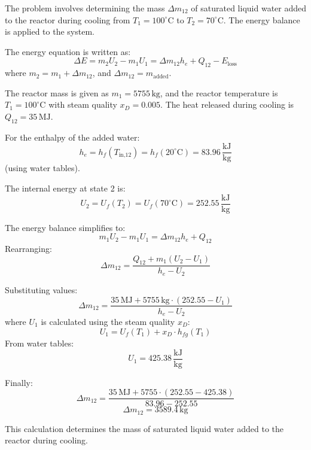 The problem involves determining the mass \( \Delta m_{12} \) of saturated liquid water added to the reactor during cooling from \( T_1 = 100^\circ\text{C} \) to \( T_2 = 70^\circ\text{C} \). The energy balance is applied to the system.

The energy equation is written as:  
\[
\Delta E = m_2 U_2 - m_1 U_1 = \Delta m_{12} h_e + Q_{12} - E_{\text{loss}}
\]  
where \( m_2 = m_1 + \Delta m_{12} \), and \( \Delta m_{12} = m_{\text{added}} \).  

The reactor mass is given as \( m_1 = 5755 \, \text{kg} \), and the reactor temperature is \( T_1 = 100^\circ\text{C} \) with steam quality \( x_D = 0.005 \). The heat released during cooling is \( Q_{12} = 35 \, \text{MJ} \).  

For the enthalpy of the added water:  
\[
h_e = h_f(T_{\text{in,12}}) = h_f(20^\circ\text{C}) = 83.96 \, \frac{\text{kJ}}{\text{kg}}
\]  
(using water tables).  

The internal energy at state 2 is:  
\[
U_2 = U_f(T_2) = U_f(70^\circ\text{C}) = 252.55 \, \frac{\text{kJ}}{\text{kg}}
\]  

The energy balance simplifies to:  
\[
m_1 U_2 - m_1 U_1 = \Delta m_{12} h_e + Q_{12}
\]  
Rearranging:  
\[
\Delta m_{12} = \frac{Q_{12} + m_1 (U_2 - U_1)}{h_e - U_2}
\]  

Substituting values:  
\[
\Delta m_{12} = \frac{35 \, \text{MJ} + 5755 \, \text{kg} \cdot (252.55 - U_1)}{h_e - U_2}
\]  
where \( U_1 \) is calculated using the steam quality \( x_D \):  
\[
U_1 = U_f(T_1) + x_D \cdot h_{fg}(T_1)
\]  
From water tables:  
\[
U_1 = 425.38 \, \frac{\text{kJ}}{\text{kg}}
\]  

Finally:  
\[
\Delta m_{12} = \frac{35 \, \text{MJ} + 5755 \cdot (252.55 - 425.38)}{83.96 - 252.55}
\]  
\[
\Delta m_{12} = 3589.4 \, \text{kg}
\]  

This calculation determines the mass of saturated liquid water added to the reactor during cooling.
